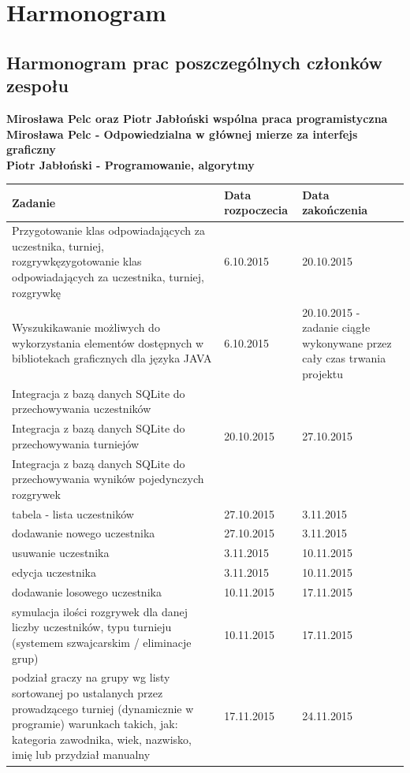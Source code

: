 \section{Harmonogram}
\subsection{Harmonogram prac poszczególnych członków zespołu}
\textbf{Mirosława Pelc oraz Piotr Jabłoński wspólna praca programistyczna\\
Mirosława Pelc - Odpowiedzialna w głównej mierze za interfejs graficzny\\
Piotr Jabłoński - Programowanie, algorytmy\\}
\begin{tabular}{|p{9cm}|l|p{3cm}|} \hline
Zadanie & Data rozpoczecia & Data zakończenia\\ \hline
Przygotowanie klas odpowiadających za uczestnika, turniej, rozgrywkęzygotowanie klas odpowiadających za uczestnika, turniej, rozgrywkę & 6.10.2015 & 20.10.2015 \\ \hline
Wyszukikawanie możliwych do wykorzystania elementów dostępnych w bibliotekach graficznych dla języka JAVA& 6.10.2015 & 20.10.2015 - zadanie ciągłe wykonywane przez cały czas trwania projektu\\ \hline
Integracja z bazą danych SQLite do przechowywania uczestników& &\\
Integracja z bazą danych SQLite do przechowywania turniejów&20.10.2015&27.10.2015\\
Integracja z bazą danych SQLite do przechowywania wyników pojedynczych rozgrywek&&\\ \hline
tabela - lista uczestników&27.10.2015&3.11.2015\\ \hline
dodawanie nowego uczestnika&27.10.2015&3.11.2015\\ \hline
usuwanie uczestnika&3.11.2015&10.11.2015\\ \hline
edycja uczestnika&3.11.2015&10.11.2015\\ \hline
dodawanie losowego uczestnika&10.11.2015&17.11.2015\\ \hline
symulacja ilości rozgrywek dla danej liczby uczestników, typu turnieju (systemem szwajcarskim / eliminacje grup)&10.11.2015&17.11.2015\\ \hline
podział graczy na grupy wg listy sortowanej po ustalanych przez prowadzącego turniej (dynamicznie w programie) warunkach takich, jak: kategoria zawodnika, wiek, nazwisko, imię lub przydział manualny&17.11.2015&24.11.2015\\ \hline

\end{tabular}

